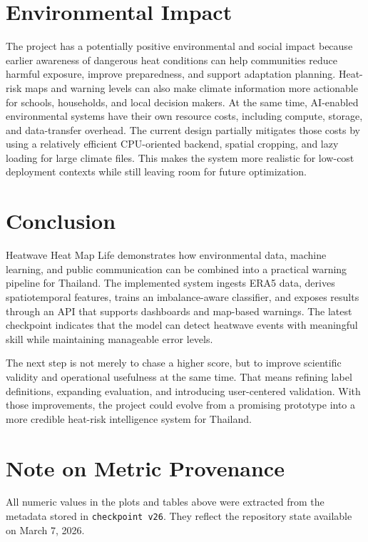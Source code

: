 \documentclass[12pt,a4paper]{article}
\begin{document}
\section{Environmental Impact}
The project has a potentially positive environmental and social impact because earlier awareness of dangerous heat conditions can help communities reduce harmful exposure, improve preparedness, and support adaptation planning. Heat-risk maps and warning levels can also make climate information more actionable for schools, households, and local decision makers. At the same time, AI-enabled environmental systems have their own resource costs, including compute, storage, and data-transfer overhead. The current design partially mitigates those costs by using a relatively efficient CPU-oriented backend, spatial cropping, and lazy loading for large climate files. This makes the system more realistic for low-cost deployment contexts while still leaving room for future optimization.

\section{Conclusion}
Heatwave Heat Map Life demonstrates how environmental data, machine learning, and public communication can be combined into a practical warning pipeline for Thailand. The implemented system ingests ERA5 data, derives spatiotemporal features, trains an imbalance-aware classifier, and exposes results through an API that supports dashboards and map-based warnings. The latest checkpoint indicates that the model can detect heatwave events with meaningful skill while maintaining manageable error levels.

The next step is not merely to chase a higher score, but to improve scientific validity and operational usefulness at the same time. That means refining label definitions, expanding evaluation, and introducing user-centered validation. With those improvements, the project could evolve from a promising prototype into a more credible heat-risk intelligence system for Thailand.

\section*{Note on Metric Provenance}
All numeric values in the plots and tables above were extracted from the metadata stored in \texttt{checkpoint v26}. They reflect the repository state available on March 7, 2026.
\end{document}
